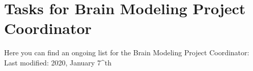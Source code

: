 \chapter{Tasks for Brain Modeling Project Coordinator}

 Here you can find an ongoing list for the Brain Modeling Project Coordinator:\\
 \newline
 Last modified: 2020, January 7^{th}\\
 
 
\newpage
